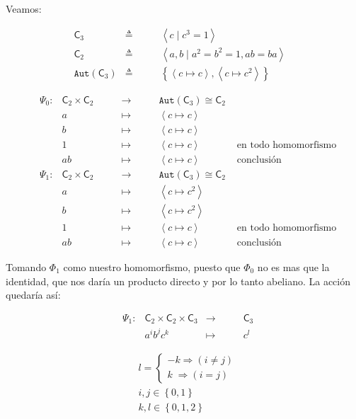 \documentclass[12pt,a4paper,fleqn,spanish,final,openright]{extbook}
\theoremstyle{definition}
\theoremstyle{remark}
\begin{document}
Veamos:
\begin{flushleft}
\begin{align*}
&{{\mathsf{C}}_{3}} &\triangleq \qquad&{\left\langle{c\mid c^3=1}\right\rangle}&&\\
&{{\mathsf{C}}_{2}} &\triangleq \qquad&{\left\langle{a,b\mid a^2=b^2=1, ab=ba}\right\rangle}&&\\
&{\mathtt{Aut}}{\left({{\mathsf{C}}_{3}}\right)} &\triangleq \qquad&\left\lbrace{\left\langle c\mapsto c \right\rangle,\left\langle c\mapsto c^2 \right\rangle}\right\rbrace&&
\end{align*}

\begin{align*}
&\Psi_0 : &{{{\mathsf{C}}_{2}}\times{{\mathsf{C}}_{2}}}\qquad &\longrightarrow &{\mathtt{Aut}}{\left({{\mathsf{C}}_{3}}\right)}\cong{{\mathsf{C}}_{2}}&\\
&&a&\mapsto\qquad & \left\langle c\mapsto c \right\rangle&\\
&&b&\mapsto\qquad & \left\langle c\mapsto c \right\rangle&\\
&&1&\mapsto\qquad & \left\langle c\mapsto c \right\rangle &\mbox{ en todo homomorfismo}\\
&&ab&\mapsto\qquad & \left\langle c\mapsto c \right\rangle &\mbox{ conclusión}\\
&\Psi_1 : &{{{\mathsf{C}}_{2}}\times{{\mathsf{C}}_{2}}}\qquad &\longrightarrow &{\mathtt{Aut}}{\left({{\mathsf{C}}_{3}}\right)}\cong{{\mathsf{C}}_{2}}&\\
&&a&\mapsto\qquad & \left\langle c\mapsto c^2 \right\rangle&\\
&&b&\mapsto\qquad & \left\langle c\mapsto c^2 \right\rangle&\\
&&1&\mapsto\qquad & \left\langle c\mapsto c \right\rangle &\mbox{ en todo homomorfismo}\\ 
&&ab&\mapsto\qquad & \left\langle c\mapsto c \right\rangle &\mbox{ conclusión}
\end{align*}
\end{flushleft}

Tomando $\Phi_1$ como nuestro homomorfismo, puesto que $\Phi_0$ no es mas que la identidad, que nos daría un producto directo y por lo tanto abeliano. La acción quedaría así:

\begin{flushright}
\begin{align*}
&\Psi_1 : &{{{\mathsf{C}}_{2}}\times{{\mathsf{C}}_{2}}}\times{{\mathsf{C}}_{3}} &\longrightarrow &{{\mathsf{C}}_{3}}\\
&&a^ib^jc^k&\mapsto\qquad & c^l
\end{align*}


\begin{align*}
&l=
\begin{cases}
-k \Rightarrow (i\neq j)\\
k \;\Rightarrow (i=j)
\end{cases}
\\
& i,j \in \left\lbrace 0,1 \right\rbrace\\ 
& k,l \in \left\lbrace 0,1,2 \right\rbrace
\end{align*}
\end{flushright}
\end{document}
